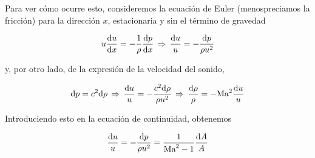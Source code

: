 	
	Para ver cómo ocurre esto, consideremos la ecuación de Euler (menospreciamos
	la fricción) para la dirección $x$, estacionaria y sin el término
	de gravedad 
	
\begin{equation}
		u\frac{\textrm{d} u}{\textrm{d} x}=-\frac{1}{\rho}\frac{\textrm{d} p}{\textrm{d} x}\,\Rightarrow\,\frac{\text{d} u}{u}=-\frac{\text{d} p}{\rho u^{2}}
\end{equation}
	
	y, por otro lado, de la expresión de la velocidad del sonido, 
	
\begin{equation}
		\text{d} p=c^{2}\text{d}\rho\,\Rightarrow\,\frac{\text{d} u}{u}=-\frac{c^{2}\text{d}\rho}{\rho u^{2}}\,\Rightarrow\,\frac{\text{d}\rho}{\rho}=-\text{Ma}^{2}\frac{\text{d} u}{u}
\end{equation}
	
	
	Introduciendo esto en la ecuación de continuidad, obtenemos 
	
\begin{equation}
		\frac{\text{d} u}{u}=-\frac{\text{d} p}{\rho u^{2}}=\frac{1}{\text{Ma}^{2}-1}\frac{\text{d} A}{A}
\end{equation}
	
	\bigskip
	
